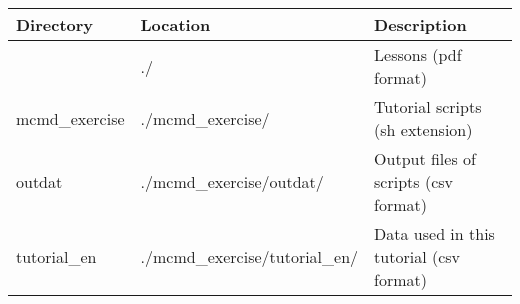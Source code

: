 \begin{table}[htbp]
{\small
\begin{tabular}{ l l l }
\hline
\textbf{Directory}   & \textbf{Location} & \textbf{Description}   \\
\hline
 & ./ & Lessons (pdf format) \\
mcmd\_exercise & ./mcmd\_exercise/ & Tutorial scripts (sh extension) \\
outdat & ./mcmd\_exercise/outdat/ & Output files of scripts (csv format)  \\
tutorial\_en & ./mcmd\_exercise/tutorial\_en/ & Data used in this tutorial (csv format)  \\

\hline
\end{tabular} 
}
\end{table} 

